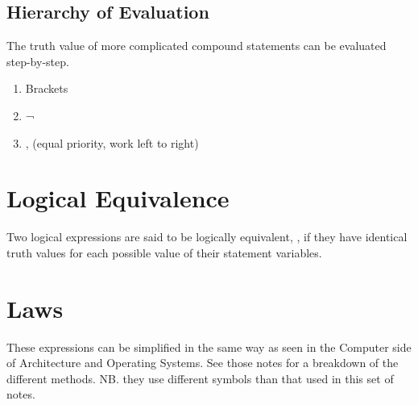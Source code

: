 \subsection*{Hierarchy of Evaluation}
The truth value of more complicated compound statements can be evaluated step-by-step.
\begin{enumerate}
    \item Brackets
    \item ¬
    \item \vee, \wedge (equal priority, work left to right)
\end{enumerate}

\section*{Logical Equivalence}
Two logical expressions are said to be logically equivalent, \equiv, if they have identical truth values for each possible value of their statement variables.

\section*{Laws}
These expressions can be simplified in the same way as seen in the Computer side of Architecture and Operating Systems. See those notes for a breakdown of the different methods. NB. they use different symbols than that used in this set of notes. 
